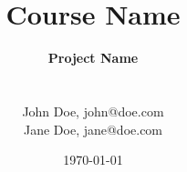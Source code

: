 \documentclass[a4paper, 11pt, article, oneside, final]{memoir}
\title{Course Name}
\author{
  {\noindent\HUGE\bfseries Project Name} \\ \\ \\
  John Doe, john@doe.com \\
  Jane Doe, jane@doe.com \\
}
\date{\today}
\begin{document}
\sloppy
\maketitle

\newpage
\tableofcontents
\cleardoublepage



\newpage




\newpage
\appendix

\end{document}
